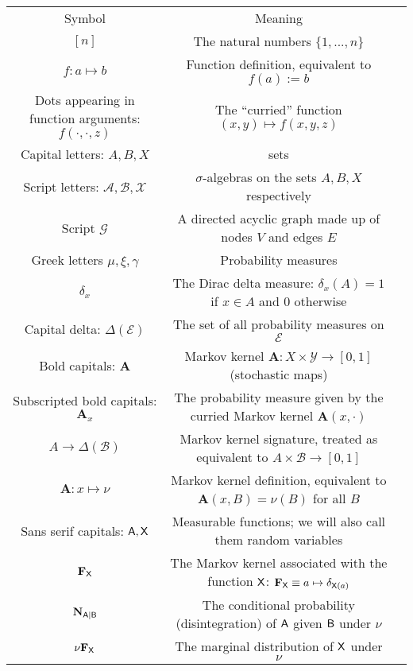 \begin{center}
\begin{tabular}{ |c|c|c| } 
 \hline
 Symbol & Meaning \\ 
 $[n]$& The natural numbers $\{1,...,n\}$ \\ 
 $f:a\mapsto b$ & Function definition, equivalent to $f(a):=b$\\
 Dots appearing in function arguments: $f(\cdot,\cdot,z)$ & The ``curried'' function $(x, y )\mapsto f(x,y,z)$\\
 Capital letters: $A,B, X$ & sets \\ 
 Script letters: $\mathcal{A},\mathcal{B},\mathcal{X}$ & $\sigma$-algebras on the sets $A, B, X$ respectively\\
 Script $\mathcal{G}$ & A directed acyclic graph made up of nodes $V$ and edges $E$\\
 Greek letters $\mu, \xi, \gamma$ & Probability measures\\
 $\delta_x$ & The Dirac delta measure: $\delta_x(A) = 1$ if $x\in A$ and $0$ otherwise\\
 Capital delta: $\Delta(\mathcal{E})$ & The set of all probability measures on $\mathcal{E}$\\
 Bold capitals: $\mathbf{A}$ & Markov kernel $\mathbf{A}:X\times\mathcal{Y}\to [0,1]$ (stochastic maps)\\
 Subscripted bold capitals: $\mathbf{A}_x$ & The probability measure given by the curried Markov kernel $\mathbf{A}(x,\cdot)$\\
 $A\to\Delta(\mathcal{B})$ & Markov kernel signature, treated as equivalent to $A\times \mathcal{B}\to [0,1]$\\
 $\mathbf{A}:x\mapsto \nu$ & Markov kernel definition, equivalent to $\mathbf{A}(x,B) = \nu(B)$ for all $B$\\
 Sans serif capitals: $\mathsf{A},\mathsf{X}$ & Measurable functions; we will also call them random variables\\
 $\mathbf{F}_{\mathsf{X}}$ & The Markov kernel associated with the function $\mathsf{X}$: $\mathbf{F}_{\mathsf{X}} \equiv a\mapsto \delta_{\mathsf{X}(a)}$\\
 $\mathbf{N}_{\mathsf{A}|\mathsf{B}}$ & The conditional probability (disintegration) of $\mathsf{A}$ given $\mathsf{B}$ under $\nu$\\
 $\nu \mathbf{F}_{\mathsf{X}}$ & The marginal distribution of $\mathsf{X}$ under $\nu$\\
 \hline
\end{tabular}
\end{center}

